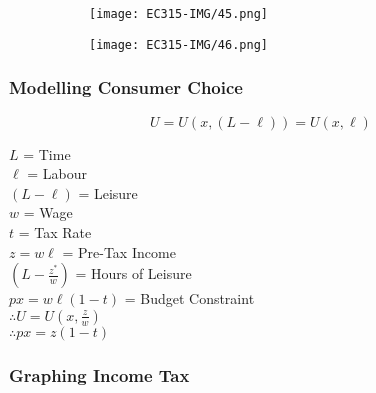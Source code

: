 \documentclass[11pt, english]{article}
\begin{document}
	\begin{figure}[H]      
        \begin{center}                     
                \begin{subfigure}[t]{7cm}  
                \begin{center}             
                        \texttt{[image: EC315-IMG/45.png]}
                \end{center}               
                \end{subfigure}            
                \begin{subfigure}[t]{7cm}  
                \begin{center}                                                    
                        \texttt{[image: EC315-IMG/46.png]}
                \end{center}   
                \end{subfigure}
	\end{center}
        \end{figure}

		\subsubsection{Modelling Consumer Choice}

	$$U=U(x,(L-\ell))=U(x,\ell)$$

	$L$ = Time\\
	$\ell$ = Labour\\
	$(L-\ell)$ = Leisure\\
	$w$ = Wage\\
	$t$ = Tax Rate\\
	$z=w\ell$ = Pre-Tax Income\\
	$\left(L-\frac{z^*}{w}\right)$ = Hours of Leisure\\
	$px=w\ell(1-t)$ = Budget Constraint\\
	$\therefore U=U(x,\frac{z}{w})$\\
	$\therefore px=z(1-t)$

		\subsubsection{Graphing Income Tax}
\end{document}
